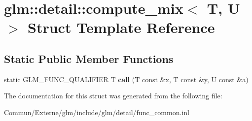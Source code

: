 \hypertarget{structglm_1_1detail_1_1compute__mix}{}\section{glm\+:\+:detail\+:\+:compute\+\_\+mix$<$ T, U $>$ Struct Template Reference}
\label{structglm_1_1detail_1_1compute__mix}
\subsection*{Static Public Member Functions}
\begin{DoxyCompactItemize}
\item 
static G\+L\+M\+\_\+\+F\+U\+N\+C\+\_\+\+Q\+U\+A\+L\+I\+F\+I\+ER T {\bfseries call} (T const \&x, T const \&y, U const \&a)\hypertarget{structglm_1_1detail_1_1compute__mix_a13fd963d8385f36486509a48fd68da1c}{}\label{structglm_1_1detail_1_1compute__mix_a13fd963d8385f36486509a48fd68da1c}

\end{DoxyCompactItemize}


The documentation for this struct was generated from the following file\+:\begin{DoxyCompactItemize}
\item 
Commun/\+Externe/glm/include/glm/detail/func\+\_\+common.\+inl\end{DoxyCompactItemize}
